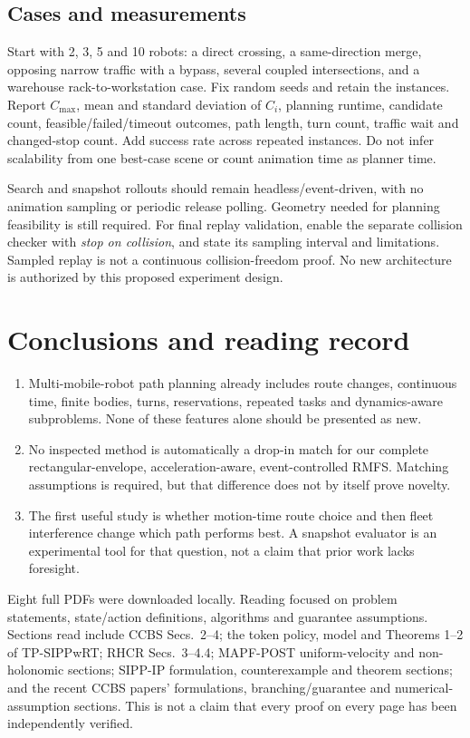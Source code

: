 \documentclass[11pt,a4paper]{article}
\begin{document}
\subsection*{Cases and measurements}
Start with 2, 3, 5 and 10 robots: a direct crossing, a same-direction merge,
opposing narrow traffic with a bypass, several coupled intersections, and a
warehouse rack-to-workstation case. Fix random seeds and retain the instances.
Report $C_{\max}$, mean and standard deviation of $C_i$, planning runtime,
candidate count, feasible/failed/timeout outcomes, path length, turn count,
traffic wait and changed-stop count. Add success rate across repeated instances.
Do not infer scalability from one best-case scene or count animation time as
planner time.

Search and snapshot rollouts should remain headless/event-driven, with no
animation sampling or periodic release polling. Geometry needed for planning
feasibility is still required. For final replay validation, enable the separate
collision checker with \emph{stop on collision}, and state its sampling interval
and limitations. Sampled replay is not a continuous collision-freedom proof.
No new architecture is authorized by this proposed experiment design.

\clearpage
\section{Conclusions and reading record}
\begin{enumerate}
\item Multi-mobile-robot path planning already includes route changes, continuous
time, finite bodies, turns, reservations, repeated tasks and dynamics-aware
subproblems. None of these features alone should be presented as new.
\item No inspected method is automatically a drop-in match for our complete
rectangular-envelope, acceleration-aware, event-controlled RMFS. Matching
assumptions is required, but that difference does not by itself prove novelty.
\item The first useful study is whether motion-time route choice and then fleet
interference change which path performs best. A snapshot evaluator is an
experimental tool for that question, not a claim that prior work lacks foresight.
\end{enumerate}

Eight full PDFs were downloaded locally. Reading focused on problem statements,
state/action definitions, algorithms and guarantee assumptions. Sections read
include CCBS Secs.~2--4; the token policy, model and Theorems 1--2 of TP-SIPPwRT; RHCR
Secs.~3--4.4; MAPF-POST uniform-velocity and non-holonomic sections; SIPP-IP
formulation, counterexample and theorem sections; and the recent CCBS papers'
formulations, branching/guarantee and numerical-assumption sections. This is not
a claim that every proof on every page has been independently verified.
\end{document}
